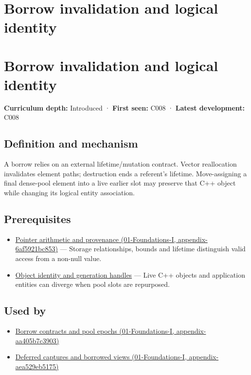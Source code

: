 \hypertarget{appendix-f9b8b9188c7f}{}
\section*{Borrow invalidation and logical identity}
\section{Borrow invalidation and logical identity}\label{borrow-invalidation-and-logical-identity}

\textbf{Curriculum depth:} Introduced · \textbf{First seen:} C008 · \textbf{Latest development:} C008

\subsection{Definition and mechanism}\label{definition-and-mechanism}

A borrow relies on an external lifetime/mutation contract. Vector reallocation invalidates element paths; destruction ends a referent's lifetime. Move-assigning a final dense-pool element into a live earlier slot may preserve that C++ object while changing its logical entity association.

\subsection{Prerequisites}\label{prerequisites}

\begin{itemize}
\tightlist
\item
  \href{}{Pointer arithmetic and provenance (01-Foundations-I, appendix-6af5921bc853)} --- Storage relationships, bounds and lifetime distinguish valid access from a non-null value.
\item
  \hyperref[appendix-f1581457d322]{Object identity and generation handles} --- Live C++ objects and application entities can diverge when pool slots are repurposed.
\end{itemize}

\subsection{Used by}\label{used-by}

\begin{itemize}
\tightlist
\item
  \href{}{Borrow contracts and pool epochs (01-Foundations-I, appendix-aa405b7c3903)}
\item
  \href{}{Deferred captures and borrowed views (01-Foundations-I, appendix-aea529eb5175)}
\end{itemize}

